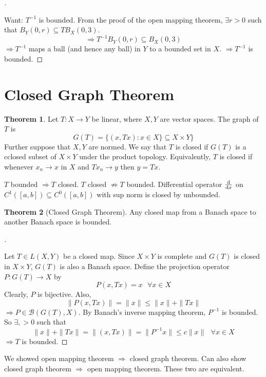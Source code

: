 \documentclass{article}
\theoremstyle{definition}
\newtheorem{thm}{Theorem}
\newenvironment{proofs}[1][\proofname]{%
  \begin{proof}[#1]$ $\par\nobreak\ignorespaces
}{%
  \end{proof}
}
\newcommand{\sfa}{\text{  } \forall}
\begin{document}
\begin{proofs}
	Want: $T^{-1}$ is bounded.
	From the proof of the open mapping theorem, $\exists r > 0$ such that $B_Y(0, r) \subseteq T B_X(0, 3)$.
	\[
		\Rightarrow T^{-1} B_Y(0, r) \subseteq B_X(0, 3)
	\]
	$\Rightarrow T^{-1}$ maps a ball (and hence any ball) in $Y$ to a bounded set in $X$.
	$\Rightarrow T^{-1}$ is bounded.
\end{proofs}

\section{Closed Graph Theorem}

\begin{thm}
	Let $T: X \to Y$ be linear, where $X, Y$ are vector spaces.
	The graph of $T$ is 
	\[
		G(T) = \{ (x, Tx) : x \in X \} \subseteq X \times Y\}
	\]
	Further suppose that $X, Y$ are normed.
	We say that $T$ is closed if $G(T)$ is a cclosed subset of $X \times Y$ under the product topology.
	Equivalently, $T$ is closed if whenever $x_n \to x$ in $X$ and $T x_n \to y$ then $y = T x$.
\end{thm}

$T$ bounded $\Rightarrow T$ closed. 
$T$ closed $\not\Rightarrow T$ bounded.
Differential operator $\dv{x}$ on $C^1([a, b]) \subseteq C^0([a, b])$ with sup norm is closed by unbounded.

\begin{thm}[Closed Graph Theorem]
	Any closed map from a Banach space to another Banach space is bounded.
\end{thm}

\begin{proofs}
	Let $T \in L(X, Y)$ be a closed map.
	Since $X \times Y$ is complete and $G(T)$ is closed in $X \times Y$, $G(T)$ is also a Banach space.
	Define the projection operator $P: G(T) \to X$ by 
	\[
		P(x, T x) = x \sfa x \in X
	\]
	Clearly, $P$ is bijective.
	Also, 
	\[
		\|P(x, Tx)\| = \|x\| \leq \|x\| + \|T x\|
	\]
	$\Rightarrow P \in \mathcal{B}(G(T), X)$.
	By Banach's inverse mapping theorem, $P^{-1}$ is bounded.
	So $\exists , > 0$ such that 
	\[
		\|x\| + \|T x \| = \|(x, T x) \| = \| P^{-1} x\| \leq c \|x\| \sfa x \in X
	\]
	$\Rightarrow T$ is bounded.
\end{proofs}

We showed open mapping theorem $\Rightarrow$ closed graph theorem. 
Can also show closed graph theorem $\Rightarrow$ open mapping theorem.
These two are equivalent.
\end{document}
